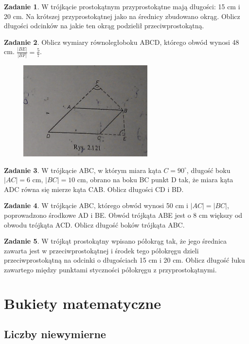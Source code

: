 \documentclass[11pt]{article}
\theoremstyle{definition}
\newtheorem{zad}{Zadanie}
\begin{document}
\begin{zad}
W trójkącie prostokątnym przyprostokątne mają długości: 15 cm i 20 cm. Na krótszej przyprostokątnej jako na średnicy zbudowano okrąg. Oblicz długości odcinków na jakie ten okrąg podzielił przeciwprostokątną.
\end{zad}

\begin{zad}
Oblicz wymiary równoległoboku ABCD, którego obwód wynosi 48 cm. $\frac{|BE|}{|BF|} = \frac57$.

\begin{figure}[h]
\centering
\includegraphics[width=0.4\linewidth]{rys2121.png}
\end{figure}
\end{zad}


\begin{zad}
W trójkącie ABC, w którym miara kąta $C=90^\circ$, długość boku $|AC|=6$ cm, $|BC| = 10$ cm, obrano na boku BC punkt D tak, że miara kąta ADC równa się mierze kąta CAB. Oblicz długości CD i BD.
\end{zad}

\begin{zad}
W trójkącie ABC, którego obwód wynosi 50 cm i $|AC| = |BC|$, poprowadzono środkowe AD i BE. Obwód trójkąta ABE jest o 8 cm większy od obwodu trójkąta ACD. Oblicz długość boków trójkąta ABC.
\end{zad}

\begin{zad}
W trójkąt prostokątny wpisano półokrąg tak, że jego średnica zawarta jest w przeciwprostokątnej i środek tego półokręgu dzieli przeciwprostokątną na odcinki o długościach 15 cm i 20 cm. Oblicz długość łuku zawartego między punktami styczności półokręgu z przyprostokątnymi.
\end{zad}

\section{Bukiety matematyczne}

\subsection{Liczby niewymierne}
\end{document}
